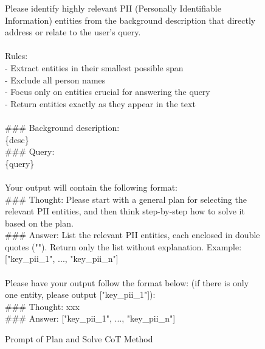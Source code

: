 \begin{figure*}[htbp]
\begin{tcolorbox}[colback=white, colframe=black, title=Plan-and-Solve Query-related PII Detection Prompt]
Please identify highly relevant PII (Personally Identifiable Information) entities from the background description that directly address or relate to the user's query.\\
\\
Rules:\\
- Extract entities in their smallest possible span\\
- Exclude all person names\\
- Focus only on entities crucial for answering the query\\
- Return entities exactly as they appear in the text\\
\\
\#\#\# Background description:\\
\{desc\}\\
\#\#\# Query:\\
\{query\}\\
\\
Your output will contain the following format:\\
\#\#\# Thought: Please start with a general plan for selecting the relevant PII entities, and then think step-by-step how to solve it based on the plan.\\
\#\#\# Answer: List the relevant PII entities, each enclosed in double quotes (""). Return only the list without explanation. Example: ["key\_pii\_1", ..., "key\_pii\_n"]\\
\\
Please have your output follow the format below: (if there is only one entity, please output ["key\_pii\_1"]):\\
\#\#\# Thought: xxx\\
\#\#\# Answer: ["key\_pii\_1", ..., "key\_pii\_n"]\\
\end{tcolorbox}
\caption{Prompt of Plan and Solve CoT Method}
\label{fig:plan-solve-prompt}
\end{figure*}